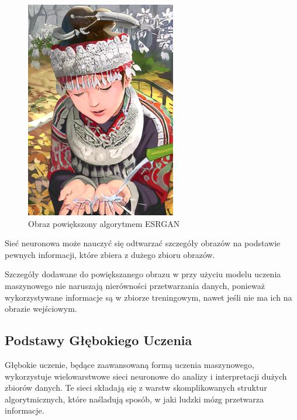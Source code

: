 \begin{figure}[ht]
\begin{minipage}[t]{0.3\linewidth}
        \includegraphics[width=\linewidth]{Rozdziały/02.Podstawy_teoretyczne/comic_ESRGAN_x4.png}
        \caption{Obraz powiększony algorytmem ESRGAN}
        \label{fig:image13}
    \end{minipage}
\end{figure}

Sieć neuronowa może nauczyć się odtwarzać szczegóły obrazów na podstawie pewnych informacji, które zbiera z dużego zbioru obrazów. 

Szczegóły dodawane do powiększanego obrazu w przy użyciu modelu uczenia maszynowego nie naruszają nierówności przetwarzania danych, ponieważ wykorzystywane informacje są w zbiorze treningowym, nawet jeśli nie ma ich na obrazie wejściowym.





\subsection*{Podstawy Głębokiego Uczenia}
Głębokie uczenie, będące zaawansowaną formą uczenia maszynowego, wykorzystuje wielowarstwowe sieci neuronowe do analizy i interpretacji dużych zbiorów danych. Te sieci składają się z warstw skomplikowanych struktur algorytmicznych, które naśladują sposób, w jaki ludzki mózg przetwarza informacje.


